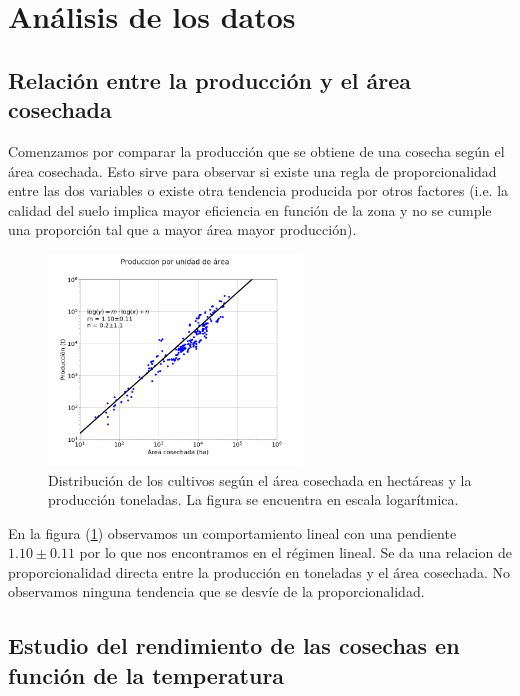 \documentclass[12pt, spanish]{article}
\begin{document}
\section{Análisis de los datos}





\subsection{Relación entre la producción y el área cosechada}

Comenzamos por comparar la producción que se obtiene de una cosecha según el área cosechada. Esto sirve para observar si existe una regla de proporcionalidad entre las dos variables o existe otra tendencia producida por otros factores (i.e. la calidad del suelo implica mayor eficiencia en función de la zona y no se cumple una proporción tal que a mayor área mayor producción).

\begin{figure}[H]
    \centering
	\includegraphics[width=0.6\textwidth]{figures/cosecha.png} %
	\caption{Distribución de los cultivos según el área cosechada en hectáreas y la producción toneladas. La figura se encuentra en escala logarítmica.}
	\label{fig:cosecha}
\end{figure}

En la figura (\ref{fig:cosecha}) observamos un comportamiento lineal con una pendiente $1.10 \pm 0.11$ por lo que nos encontramos en el régimen lineal. Se da una relacion de proporcionalidad directa entre la producción en toneladas y el área cosechada. No observamos ninguna tendencia que se desvíe de la proporcionalidad.

\subsection{Estudio del rendimiento de las cosechas en función de la temperatura}
\end{document}
